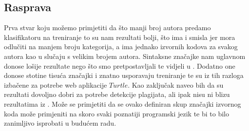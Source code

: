 \subsection{Rasprava}

Prva stvar koju možemo primjetiti da što manji broj autora predamo klasifikatoru na treniranje to su nam rezultati bolji, što ima i smisla jer mora odlučiti na manjem broju kategorija, a ima jednako izvornih kodova za svakog autora kao u slučaju s velikim brojem autora. Sintaksne značajke nam uglavnom donose lošije rezultate nego što smo pretpostavljali te vidjeli u \cite{islam}. Dodatno one donose stotine tisuća značajki i znatno usporavaju treniranje te su iz tih razloga izbačene za potrebe web aplikacije $Turtle$. Kao zaključak naveo bih da su rezultati dovoljno dobri za potrebe detekcije plagijata, ali ipak nisu ni blizu rezultatima iz \cite{islam}. Može se primjetiti da se ovako definiran skup značajki izvornog koda može primjeniti na skoro svaki poznatiji programski jezik te bi to bilo zanimljivo isprobati u budućem radu.